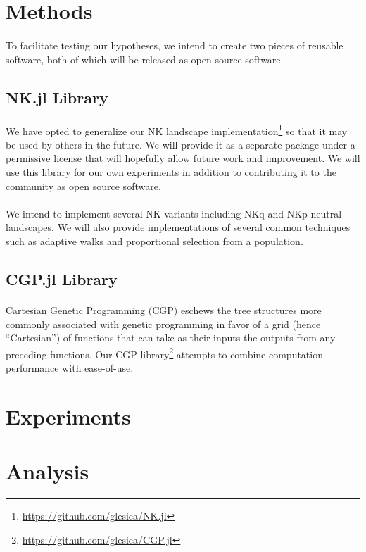 \documentclass[12pt,letterpaper,titlepage]{article}
\begin{document}
\section{Methods}

\paragraph{}
To facilitate testing our hypotheses, we intend to create two pieces of
reusable software, both of which will be released as open source software.

\subsection{NK.jl Library}

\paragraph{}
We have opted to generalize our NK landscape
implementation\footnote{\url{https://github.com/glesica/NK.jl}} so that it may
be used by others in the future. We will provide it as a separate package under
a permissive license that will hopefully allow future work and improvement.  We
will use this library for our own experiments in addition to contributing it to
the community as open source software.

\paragraph{}
We intend to implement several NK variants including NKq and NKp neutral
landscapes. We will also provide implementations of several common techniques
such as adaptive walks and proportional selection from a population.

\subsection{CGP.jl Library}

\paragraph{}
Cartesian Genetic Programming (CGP) eschews the tree structures more commonly
associated with genetic programming in favor of a grid (hence ``Cartesian'') of
functions that can take as their inputs the outputs from any preceding
functions. Our CGP library\footnote{\url{https://github.com/glesica/CGP.jl}}
attempts to combine computation performance with ease-of-use.

\section{Experiments}

\section{Analysis}


{}
\end{document}
